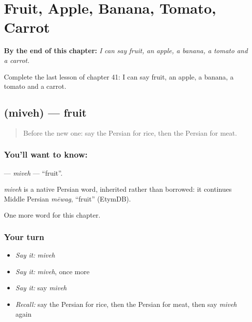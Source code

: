 
\chapter{Fruit, Apple, Banana, Tomato, Carrot}
\label{ch:fa-fruit-apple-banana-tomato-carrot}

\begin{chapteropening}
\textbf{By the end of this chapter:} \emph{I can say fruit, an apple, a banana, a tomato and a carrot.}

Complete the last lesson of chapter 41: I can say fruit, an apple, a banana, a tomato and a carrot.
\end{chapteropening}

\section[\texorpdfstring{\fa{میوه} (miveh)}{میوه (miveh)}]{ (miveh) — fruit}

\label{lesson:FA-C41-miveh}



\begin{quote}
Before the new one: say the Persian for rice, then the Persian for meat.
\end{quote}

\subsection*{You'll want to know: }
\textbf{} — \emph{miveh} — \textquotedblleft{}fruit\textquotedblright{}.

\begin{cousinweb}
\emph{miveh} is a native Persian word, inherited rather than borrowed: it continues Middle Persian \emph{mēwag}, \textquotedblleft{}fruit\textquotedblright{} (EtymDB).
\end{cousinweb}

\begin{grammarlens}[title={What you've built}]
One more word for this chapter.
\end{grammarlens}

\subsection*{Your turn}
\begin{itemize}
\raggedright
  \item \emph{Say it:} \emph{miveh}
  \item \emph{Say it:} \emph{miveh}, once more
  \item \emph{Say it:} say \emph{miveh}
  \item \emph{Recall:} say the Persian for rice, then the Persian for meat, then say \emph{miveh} again
\end{itemize}

